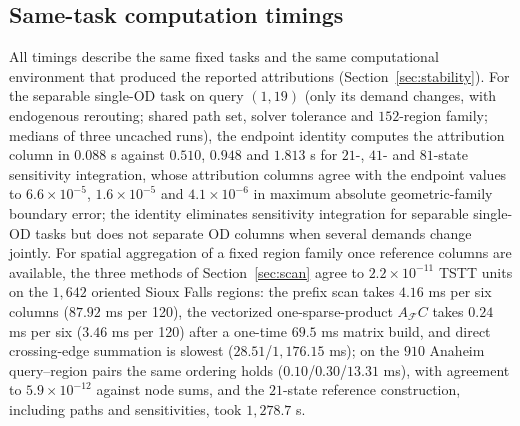 \subsection{Same-task computation timings}\label{supp:timing}
All timings describe the same fixed tasks and the same computational
environment that produced the reported attributions
(Section~\ref{sec:stability}). For the separable single-OD task on
query $(1,19)$ (only its demand changes, with endogenous rerouting;
shared path set, solver tolerance and $152$-region family; medians of
three uncached runs), the endpoint identity computes the attribution
column in $0.088$ s against $0.510$, $0.948$ and $1.813$ s for $21$-,
$41$- and $81$-state sensitivity integration, whose attribution columns
agree with the endpoint values to $6.6\times10^{-5}$,
$1.6\times10^{-5}$ and $4.1\times10^{-6}$ in maximum absolute
geometric-family boundary error; the identity eliminates sensitivity
integration for separable single-OD tasks but does not separate OD
columns when several demands change jointly. For spatial aggregation
of a fixed region family once reference columns are available, the
three methods of Section~\ref{sec:scan} agree to
$2.2\times10^{-11}$ TSTT units on the $1{,}642$ oriented Sioux Falls
regions: the prefix scan takes $4.16$ ms per six columns
($87.92$ ms per 120), the vectorized one-sparse-product
$A_{\mathcal F}C$ takes $0.24$ ms per six ($3.46$ ms per 120) after a
one-time $69.5$ ms matrix build, and direct crossing-edge summation is
slowest ($28.51$/$1{,}176.15$ ms); on the $910$ Anaheim query--region
pairs the same ordering holds ($0.10$/$0.30$/$13.31$ ms), with
agreement to $5.9\times10^{-12}$ against node sums, and the $21$-state
reference construction, including paths and sensitivities, took
$1{,}278.7$ s.











